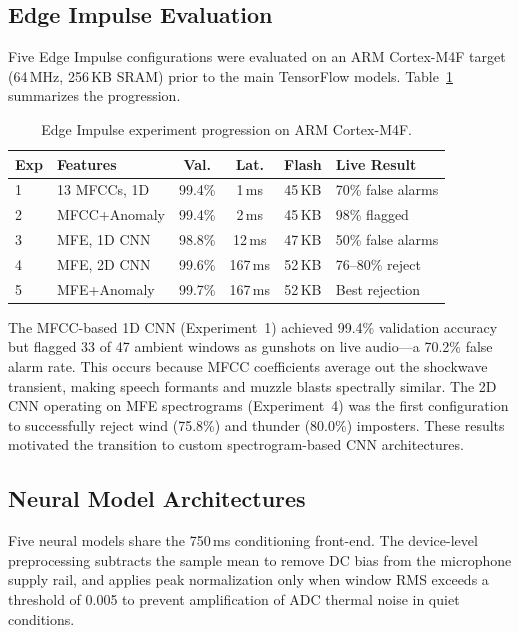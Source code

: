 \documentclass[conference]{IEEEtran}
\begin{document}
\subsection{Edge Impulse Evaluation}
Five Edge Impulse configurations were evaluated on an ARM Cortex-M4F target (64\,MHz, 256\,KB SRAM) prior to the main TensorFlow models. Table~\ref{tab:edgeimpulse} summarizes the progression.

\begin{table}[!t]
\centering
\caption{Edge Impulse experiment progression on ARM Cortex-M4F.}
\label{tab:edgeimpulse}
\footnotesize
\begin{tabular}{llcccl}
\toprule
\textbf{Exp} & \textbf{Features} & \textbf{Val.} & \textbf{Lat.} & \textbf{Flash} & \textbf{Live Result} \\
\midrule
1 & 13 MFCCs, 1D & 99.4\% & 1\,ms & 45\,KB & 70\% false alarms \\
2 & MFCC+Anomaly & 99.4\% & 2\,ms & 45\,KB & 98\% flagged \\
3 & MFE, 1D CNN & 98.8\% & 12\,ms & 47\,KB & 50\% false alarms \\
4 & MFE, 2D CNN & 99.6\% & 167\,ms & 52\,KB & 76--80\% reject \\
5 & MFE+Anomaly & 99.7\% & 167\,ms & 52\,KB & Best rejection \\
\bottomrule
\end{tabular}
\end{table}

The MFCC-based 1D CNN (Experiment~1) achieved 99.4\% validation accuracy but flagged 33 of 47 ambient windows as gunshots on live audio---a 70.2\% false alarm rate. This occurs because MFCC coefficients average out the shockwave transient, making speech formants and muzzle blasts spectrally similar. The 2D CNN operating on MFE spectrograms (Experiment~4) was the first configuration to successfully reject wind (75.8\%) and thunder (80.0\%) imposters. These results motivated the transition to custom spectrogram-based CNN architectures.

\subsection{Neural Model Architectures}
Five neural models share the 750\,ms conditioning front-end. The device-level preprocessing subtracts the sample mean to remove DC bias from the microphone supply rail, and applies peak normalization only when window RMS exceeds a threshold of 0.005 to prevent amplification of ADC thermal noise in quiet conditions.
\end{document}
